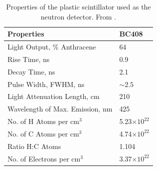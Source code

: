 \begin{table}[htp]
\centering
\begin{tabular}{ll}
Properties & BC408 \\
\hline
Light Output, \% Anthracene & 64 \\
Rise Time, ns & 0.9 \\
Decay Time, ns & 2.1 \\
Pulse Width, FWHM, ns & $\sim2.5$ \\
Light Attenuation Length, cm & 210 \\
Wavelength of Max. Emission, nm & 425 \\
No. of H Atoms per cm$^3$ & 5.23$\times10^{22}$ \\
No. of C Atoms per cm$^3$ & 4.74$\times10^{22}$ \\
Ratio H:C Atoms & 1.104 \\
No. of Electrons per cm$^3$ & 3.37$\times10^{22}$ \\
\end{tabular}
\caption{Properties of the plastic scintillator used as the neutron detector. From \cite{BC408}.}
\label{tab:BC408}
\end{table}

